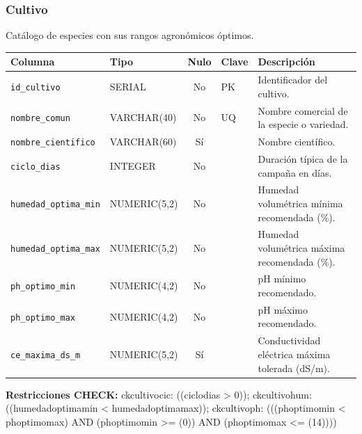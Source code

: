 \documentclass[11pt,letterpaper]{article}
\newcommand{\tbus}{\textunderscore\allowbreak}
\newcommand{\tb}[1]{{\ttfamily\let\_\tbus #1}}
\begin{document}
\subsubsection*{Cultivo}
Catálogo de especies con sus rangos agronómicos óptimos.
{\footnotesize
\begin{longtable}{>{\raggedright\arraybackslash}p{3.3cm}>{\raggedright\arraybackslash}p{2.5cm}c>{\raggedright\arraybackslash}p{2.2cm}>{\raggedright\arraybackslash}p{6.1cm}}
\toprule
\textbf{Columna} & \textbf{Tipo} & \textbf{Nulo} & \textbf{Clave} & \textbf{Descripción} \\
\midrule
\endhead
\texttt{id\_cultivo} & SERIAL & No & PK & Identificador del cultivo. \\
\texttt{nombre\_comun} & VARCHAR(40) & No & UQ & Nombre comercial de la especie o variedad. \\
\texttt{nombre\_cientifico} & VARCHAR(60) & Sí &  & Nombre científico. \\
\texttt{ciclo\_dias} & INTEGER & No &  & Duración típica de la campaña en días. \\
\texttt{humedad\_optima\_min} & NUMERIC(5,2) & No &  & Humedad volumétrica mínima recomendada (\%). \\
\texttt{humedad\_optima\_max} & NUMERIC(5,2) & No &  & Humedad volumétrica máxima recomendada (\%). \\
\texttt{ph\_optimo\_min} & NUMERIC(4,2) & No &  & pH mínimo recomendado. \\
\texttt{ph\_optimo\_max} & NUMERIC(4,2) & No &  & pH máximo recomendado. \\
\texttt{ce\_maxima\_ds\_m} & NUMERIC(5,2) & Sí &  & Conductividad eléctrica máxima tolerada (dS/m). \\
\bottomrule
\end{longtable}}
{\footnotesize\raggedright\textbf{Restricciones CHECK:} \tb{ck\_cultivo\_cic}: \tb{((ciclo\_dias > 0))}; \tb{ck\_cultivo\_hum}: \tb{((humedad\_optima\_min < humedad\_optima\_max))}; \tb{ck\_cultivo\_ph}: \tb{(((ph\_optimo\_min < ph\_optimo\_max) AND (ph\_optimo\_min >= (0)) AND (ph\_optimo\_max <= (14))))}\par}
\medskip
\end{document}

